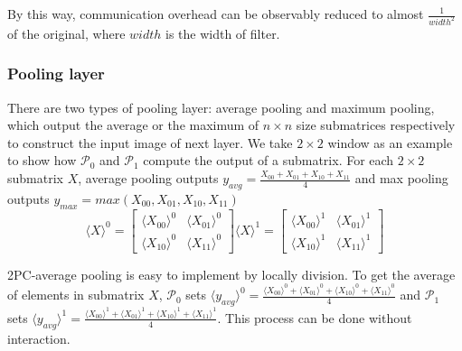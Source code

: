 \documentclass[letterpaper]{article} %
\begin{document}
    By this way, communication overhead can be observably reduced to almost $ \frac{1}{width^{2}} $ of the original,
    where $width$ is the width of filter.


    \subsubsection{Pooling layer}


    There are two types of pooling layer: average pooling and maximum pooling,
    which output the average or the maximum of $n\times n$ size submatrices respectively
    to construct the input image of next layer.
    We take $2\times 2$ window as an example to show how $\mathcal{P}_{0}$ and $\mathcal{P}_{1}$ compute the output of a submatrix.
    For each $2\times 2$ submatrix $X$, average pooling outputs $y_{avg}=\frac{X_{00}+ X_{01}+ X_{10}+  X_{11}}{4}$
    and max pooling outputs $y_{max}=max(X_{00}, X_{01}, X_{10},  X_{11})$
    $$  \langle X\rangle ^{0}= \begin{bmatrix}
        \langle X_{00}\rangle ^{0}& \langle X_{01}\rangle ^{0} \\
        \langle X_{10}\rangle ^{0}& \langle X_{11}\rangle ^{0}
       \end{bmatrix}\langle X\rangle ^{1}=\begin{bmatrix}
        \langle X_{00}\rangle ^{1}& \langle X_{01}\rangle ^{1} \\
        \langle X_{10}\rangle ^{1}& \langle X_{11}\rangle ^{1}
       \end{bmatrix}$$



    2PC-average pooling is easy to implement by locally division.
    To get the average of elements in submatrix $X$,
    $\mathcal{P}_{0}$ sets $\langle y_{avg}\rangle^{0} =$$ \frac{\langle X_{00}\rangle ^{0}+ \langle X_{01}\rangle ^{0}+
    \langle X_{10}\rangle ^{0}+ \langle X_{11}\rangle ^{0}}{4}$ and
    $\mathcal{P}_{1}$ sets $\langle y_{avg}\rangle^{1} = \frac{\langle X_{00}\rangle ^{1}+ \langle X_{01}\rangle ^{1}+
    \langle X_{10}\rangle ^{1}+ \langle X_{11}\rangle ^{1}}{4}$. This process can be done without interaction.
\end{document}
